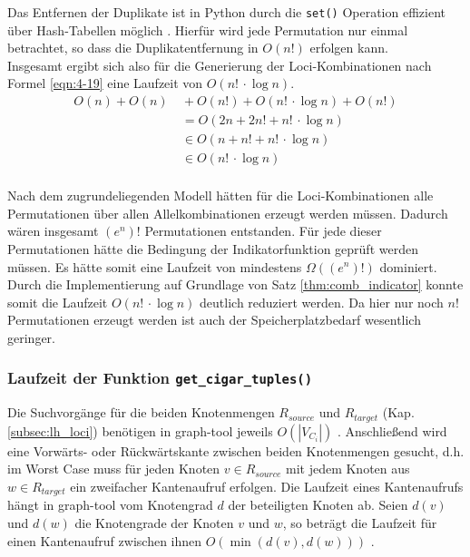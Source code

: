 Das Entfernen der Duplikate ist in Python durch die \lstinline|set()| Operation effizient über Hash-Tabellen  möglich \cite{python-sort}. Hierfür wird jede Permutation nur einmal betrachtet, so dass die Duplikatentfernung in $O(n!)$ erfolgen kann. \\

Insgesamt ergibt sich also für die Generierung der Loci-Kombinationen nach Formel \eqref{eqn:4-19} eine Laufzeit von $ O(n!\, \cdotp \log n) $.
\begin{equation} \label{eqn:4-19}
\tag{4-19}
\begin{aligned}
O(n) + O(n) &\ {} + O(n!) + O(n ! \, \cdotp \log n) + O(n!) \\
&\ = O(2n + 2 n! + n ! \, \cdotp \log n) \\
&\ {} \in O(n + n! + n ! \, \cdotp \log n)\\
&\ {} \in O(n ! \, \cdotp \log n)\\
\end{aligned}
\end{equation}

Nach dem zugrundeliegenden Modell hätten für die Loci-Kombinationen alle Permutationen über allen Allelkombinationen erzeugt werden müssen. Dadurch wären insgesamt $(e^n)!$ Permutationen entstanden. Für jede dieser Permutationen hätte die Bedingung der Indikatorfunktion geprüft werden müssen. Es hätte somit eine Laufzeit von mindestens $\Omega((e^n)!)$ dominiert. Durch die Implementierung auf Grundlage von Satz \ref{thm:comb_indicator} konnte somit die Laufzeit $ O(n!\, \cdotp \log n) $ deutlich reduziert werden. Da hier nur noch $n!$ Permutationen erzeugt werden ist auch der Speicherplatzbedarf wesentlich geringer.

\subsubsection{Laufzeit der Funktion \lstinline|get_cigar_tuples()|}

Die Suchvorgänge für die beiden Knotenmengen $ R_{source} $ und $ R_{target} $ (Kap. \ref{subsec:lh_loci}) benötigen in graph-tool jeweils $O(|V_{C_{i}}|)$ \cite{graph_tool_coplexity_find_vertex}. Anschließend wird eine Vorwärts- oder Rückwärtskante zwischen beiden Knotenmengen gesucht, d.h. im Worst Case muss für jeden Knoten $ v \in R_{source} $ mit jedem Knoten aus $w \in R_{target} $ ein zweifacher Kantenaufruf erfolgen. Die Laufzeit eines Kantenaufrufs hängt in graph-tool vom Knotengrad $d$ der beteiligten Knoten ab. Seien $d(v)$ und $d(w)$ die Knotengrade der Knoten $v$ und $w$, so beträgt die Laufzeit für einen Kantenaufruf zwischen ihnen $ O(\min (d(v), d(w)))$ \cite{docs_graph_tool}. \\

